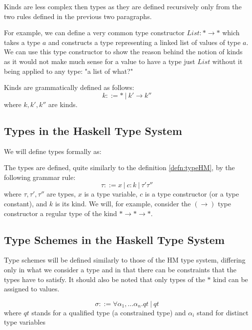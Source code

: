 Kinds are less complex then types as they are defined recursively only from the two rules defined in the previous two paragraphs.

For example, we can define a very common type constructor $List: * \rightarrow *$ which takes a type $a$ and constructs a type representing a linked list of values of type $a$. We can use this type constructor to show the reason behind the notion of kinds as it would not make much sense for a value to have a type just $List$ without it being applied to any type: "a list of what?"

\begin{defn}[Kinds]
    Kinds are grammatically defined as follows:
    $$k ::= *\ |\ k' \rightarrow k''$$
    where $k, k', k''$ are kinds.
\end{defn}

\subsection{Types in the Haskell Type System}

We will define types formally as:

\begin{defn}
    The types are defined, quite similarly to the definition \ref{defn:typeHM}, by the following grammar rule:
    $$\tau ::= x\ |\ c : k\ |\ \tau' \tau''$$
    where $\tau, \tau', \tau''$ are types, $x$ is a type variable, $c$ is a type constructor (or a type constant), and $k$ is its kind. We will, for example, consider the $(\rightarrow)$ type constructor a regular type of the kind $* \rightarrow * \rightarrow *$.
\end{defn}

\subsection{Type Schemes in the Haskell Type System}

Type schemes will be defined similarly to those of the HM type system, differing only in what we consider a type and in that there can be constraints that the types have to satisfy. It should also be noted that only types of the $*$ kind can be assigned to values.

\begin{defn}
    \label{defn:typeSchemes}
    $$\sigma ::= \forall \alpha_1, \dots \alpha_n . qt\ |\ qt$$
    where $qt$ stands for a qualified type (a constrained type) and $\alpha_i$ stand for distinct type variables
\end{defn}

